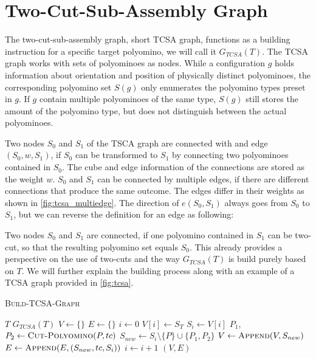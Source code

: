 \section{Two-Cut-Sub-Assembly Graph}
\label{sec:tcsa}

The two-cut-sub-assembly graph, short TCSA graph, functions as a building instruction for a specific target polyomino, we will call it $G_{TCSA}(T)$.
The TCSA graph works with sets of polyominoes as nodes.
While a configuration $g$ holds information about orientation and position of physically distinct polyominoes, the corresponding polyomino set $S(g)$ only enumerates the polyomino types preset in $g$.
If $g$ contain multiple polyominoes of the same type, $S(g)$ still stores the amount of the polyomino type, but does not distinguish between the actual polyominoes.

Two nodes $S_0$ and $S_1$ of the TSCA graph are connected with and edge $(S_0,w,S_1)$, if $S_0$ can be transformed to $S_1$ by connecting two polyominoes contained in $S_0$.
The cube and edge information of the connections are stored as the weight $w$.
$S_0$ and $S_1$ can be connected by multiple edges, if there are different connections that produce the same outcome.
The edges differ in their weights as shown in \autoref{fig:tcsa_multiedge}.
The direction of $e(S_0,S_1)$ always goes from $S_0$ to $S_1$, but we can reverse the definition for an edge as following:

Two nodes $S_0$ and $S_1$ are connected, if one polyomino contained in $S_1$ can be two-cut, so that the resulting polyomino set equals $S_0$.
This already provides a perspective on the use of two-cuts and the way $G_{TCSA}(T)$ is build purely based on $T$.
We will further explain the building process along with an example of a TCSA graph provided in \autoref{fig:tcsa}.


\begin{algorithm}
	\caption{\scshape Build-TCSA-Graph}
	\label{algo:build_tcsa}
	\begin{algorithmic}[1]
		\REQUIRE $T$
		\ENSURE $G_{TCSA}(T)$  
		\STATE $V \gets \{\}$
		\STATE $E \gets \{\}$
		\STATE $i \gets 0$
		\STATE $V[i] \gets S_T$	
			\STATE $S_i \gets V[i]$
					\STATE $P_1$,$P_2 \gets \text{\scshape Cut-Polyomino}(P, tc)$
					\STATE $S_{new} \gets S_i \setminus \{P\} \cup \{P_1, P_2\}$ 
						\STATE $V \gets \text{\scshape Append}(V, S_{new})$
					\ENDIF
					\STATE $E \gets \text{\scshape Append}(E, (S_{new}, tc, S_i))$
				\ENDFOR
			\ENDFOR
			\STATE $i \gets i+1$
		\ENDWHILE
		\RETURN $(V,E)$
	\end{algorithmic}
\end{algorithm}


